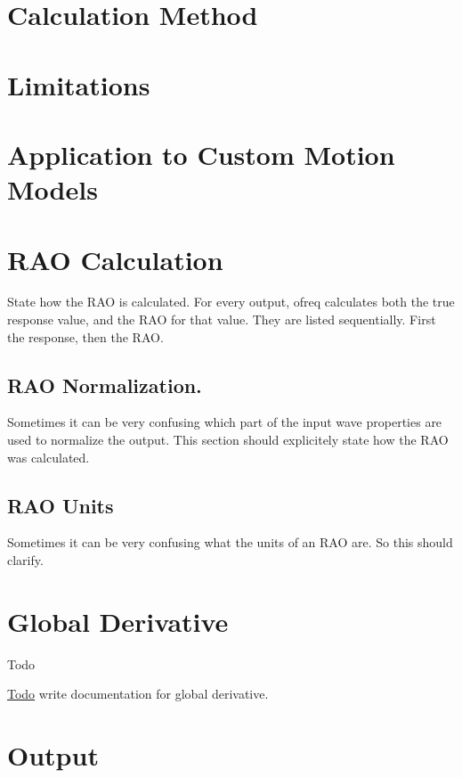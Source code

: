 \section*{Calculation Method}

\section*{Limitations}

\section*{Application to Custom Motion Models}

\section*{R\-A\-O Calculation}

State how the R\-A\-O is calculated. For every output, ofreq calculates both the true response value, and the R\-A\-O for that value. They are listed sequentially. First the response, then the R\-A\-O.

\subsection*{R\-A\-O Normalization.}

Sometimes it can be very confusing which part of the input wave properties are used to normalize the output. This section should explicitely state how the R\-A\-O was calculated.

\subsection*{R\-A\-O Units}

Sometimes it can be very confusing what the units of an R\-A\-O are. So this should clarify. \hypertarget{global_derivative}{}\section{Global Derivative}\label{global_derivative}
\begin{DoxyRefDesc}{Todo}
\item[\hyperlink{todo__todo000019}{Todo}]write documentation for global derivative.\end{DoxyRefDesc}


\section*{Output}

